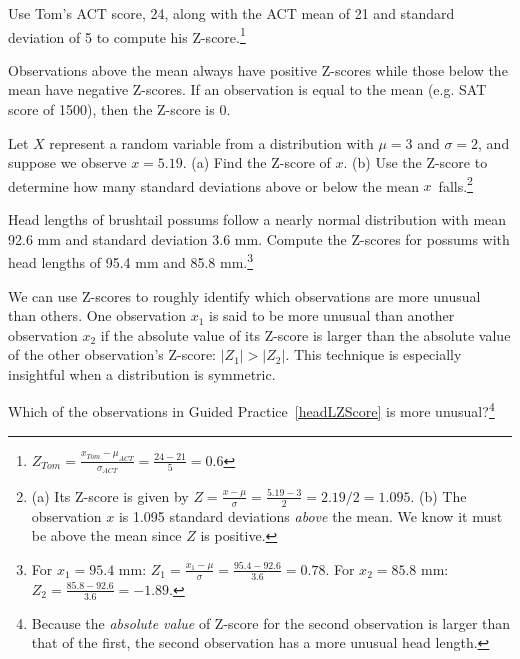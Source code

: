 \begin{exercise}
Use Tom's ACT score, 24, along with the ACT mean of 21 and standard deviation of 5 to compute his Z-score.\footnote{$Z_{Tom} = \frac{x_{Tom} - \mu_{ACT}}{\sigma_{ACT}} = \frac{24 - 21}{5} = 0.6$}
\end{exercise}

Observations above the mean always have positive Z-scores while those below the mean have negative Z-scores. If an observation is equal to the mean (e.g. SAT score of 1500), then the Z-score is $0$.

\begin{exercise}
Let $X$ represent a random variable from a distribution with $\mu = 3$ and $\sigma = 2$, and suppose we observe $x=5.19$. (a) Find the Z-score of $x$. (b) Use the Z-score to determine how many standard deviations above or below the mean $x$~falls.\footnote{(a) Its Z-score is given by $Z = \frac{x-\mu}{\sigma} = \frac{5.19 - 3}{2} = 2.19/2 = 1.095$. (b) The observation $x$ is 1.095 standard deviations \emph{above} the mean. We know it must be above the mean since $Z$ is positive.}
\end{exercise}

\begin{exercise} \label{headLZScore}
Head lengths of brushtail possums follow a nearly normal distribution with mean 92.6 mm and standard deviation 3.6 mm. Compute the Z-scores for possums with head lengths of 95.4 mm and 85.8 mm.\footnote{For $x_1=95.4$ mm: $Z_1 = \frac{x_1 - \mu}{\sigma} = \frac{95.4 - 92.6}{3.6} = 0.78$. For $x_2=85.8$ mm: $Z_2 = \frac{85.8 - 92.6}{3.6} = -1.89$.}
\end{exercise}

We can use Z-scores to roughly identify which observations are more unusual than others. One observation $x_1$ is said to be more unusual than another observation $x_2$ if the absolute value of its Z-score is larger than the absolute value of the other observation's Z-score: $|Z_1| > |Z_2|$. This technique is especially insightful when a distribution is symmetric.

\begin{exercise}
Which of the observations in Guided Practice~\ref{headLZScore} is more unusual?\footnote{Because the \emph{absolute value} of Z-score for the second observation is larger than that of the first, the second observation has a more unusual head length.}
\end{exercise}


